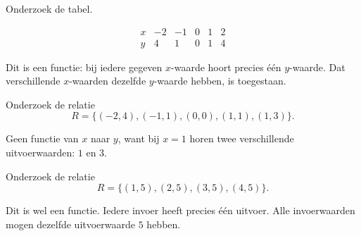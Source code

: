 \documentclass{ximera}
\begin{document}
\begin{oefening}{\oefB\ESS}

\begin{question}
Onderzoek de tabel.

\[
\begin{array}{c|ccccc}
x&-2&-1&0&1&2\\
\hline
y&4&1&0&1&4
\end{array}
\]

\begin{oplossing}
Dit is een functie: bij iedere gegeven \(x\)-waarde hoort precies één \(y\)-waarde.
Dat verschillende \(x\)-waarden dezelfde \(y\)-waarde hebben, is toegestaan.
\end{oplossing}
\end{question}

\begin{question}
Onderzoek de relatie
\[
R=\{(-2,4),(-1,1),(0,0),(1,1),(1,3)\}.
\]

\begin{oplossing}
Geen functie van \(x\) naar \(y\), want bij \(x=1\) horen twee verschillende
uitvoerwaarden: \(1\) en \(3\).
\end{oplossing}
\end{question}

\begin{question}
Onderzoek de relatie
\[
R=\{(1,5),(2,5),(3,5),(4,5)\}.
\]

\begin{oplossing}
Dit is wel een functie. Iedere invoer heeft precies één uitvoer.
Alle invoerwaarden mogen dezelfde uitvoerwaarde \(5\) hebben.
\end{oplossing}
\end{question}

\end{oefening}

\end{document}
